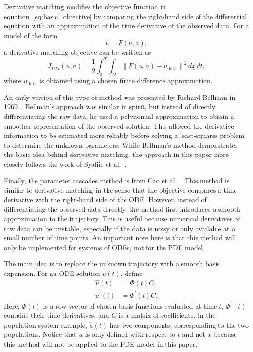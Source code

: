 \documentclass{article}
\begin{document}
Derivative matching modifies the objective function in equation~\eqref{eq:basic_objective} by comparing the right-hand side of the differential equation with an approximation of the time derivative of the observed data. For a model of the form
\[
    \dot{u} = F(u,a),
\]
a derivative-matching objective can be written as
\begin{equation}
    J_{DM}(u,a)
    =
    \frac{1}{2}
    \int_0^T \int_\Omega
    \left\|F(u,a) - \dot{u}_{\mathrm{data}}\right\|^2
    \,d\underline{x}\,dt,
    \label{eq:derivative_matching_objective}
\end{equation}
where $\dot{u}_{\mathrm{data}}$ is obtained using a chosen finite difference approximation.

An early version of this type of method was presented by Richard Bellman in 1969~\cite{bellman1969new}. Bellman's approach was similar in spirit, but instead of directly differentiating the raw data, he used a polynomial approximation to obtain a smoother representation of the observed solution. This allowed the derivative information to be estimated more reliably before solving a least-squares problem to determine the unknown parameters. While Bellman's method demonstrates the basic idea behind derivative matching, the approach in this paper more closely follows the work of Syafiie et al.~\cite{syafiie2025systems}.

Finally, the parameter cascades method is from Cao et al.~\cite{cao2008estimating}. This method is similar to derivative matching in the sense that the objective compares a time derivative with the right-hand side of the ODE. However, instead of differentiating the observed data directly, the method first introduces a smooth approximation to the trajectory. This is useful because numerical derivatives of raw data can be unstable, especially if the data is noisy or only available at a small number of time points. An important note here is that this method will only be implemented for systems of ODEs, not for the PDE model.

The main idea is to replace the unknown trajectory with a smooth basis expansion. For an ODE solution $u(t)$, define
\begin{align}
    \hat u(t) &= \Phi(t) C, \label{eq:u_hat}\\
    \hat u^\prime(t) &= \Phi^\prime(t) C. \label{eq:u_hat_prime}
\end{align}
Here, $\Phi(t)$ is a row vector of chosen basis functions evaluated at time $t$, $\Phi^\prime(t)$ contains their time derivatives, and $C$ is a matrix of coefficients. In the population-system example, $\hat u(t)$ has two components, corresponding to the two populations. Notice that $u$ is only defined with respect to $t$ and not $\underline{x}$ because this method will not be applied to the PDE model in this paper.
\end{document}
